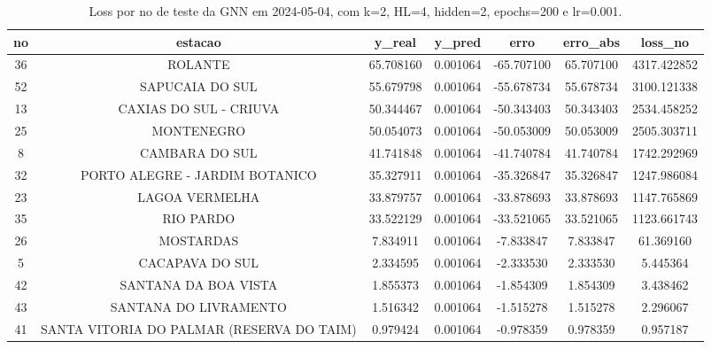 \begin{table}[h]
\centering
\caption{Loss por no de teste da GNN em 2024-05-04, com k=2, HL=4, hidden=2, epochs=200 e lr=0.001.}
\label{tab:gnn_loss_k2_hl4_h2_e200_d20240504}
\begin{tabular}{ccccccc}
\toprule
no & estacao & y\_real & y\_pred & erro & erro\_abs & loss\_no \\
\midrule
36 & ROLANTE & 65.708160 & 0.001064 & -65.707100 & 65.707100 & 4317.422852 \\
52 & SAPUCAIA DO SUL & 55.679798 & 0.001064 & -55.678734 & 55.678734 & 3100.121338 \\
13 & CAXIAS DO SUL - CRIUVA & 50.344467 & 0.001064 & -50.343403 & 50.343403 & 2534.458252 \\
25 & MONTENEGRO & 50.054073 & 0.001064 & -50.053009 & 50.053009 & 2505.303711 \\
8 & CAMBARA DO SUL & 41.741848 & 0.001064 & -41.740784 & 41.740784 & 1742.292969 \\
32 & PORTO ALEGRE - JARDIM BOTANICO & 35.327911 & 0.001064 & -35.326847 & 35.326847 & 1247.986084 \\
23 & LAGOA VERMELHA & 33.879757 & 0.001064 & -33.878693 & 33.878693 & 1147.765869 \\
35 & RIO PARDO & 33.522129 & 0.001064 & -33.521065 & 33.521065 & 1123.661743 \\
26 & MOSTARDAS & 7.834911 & 0.001064 & -7.833847 & 7.833847 & 61.369160 \\
5 & CACAPAVA DO SUL & 2.334595 & 0.001064 & -2.333530 & 2.333530 & 5.445364 \\
42 & SANTANA DA BOA VISTA & 1.855373 & 0.001064 & -1.854309 & 1.854309 & 3.438462 \\
43 & SANTANA DO LIVRAMENTO & 1.516342 & 0.001064 & -1.515278 & 1.515278 & 2.296067 \\
41 & SANTA VITORIA DO PALMAR (RESERVA DO TAIM) & 0.979424 & 0.001064 & -0.978359 & 0.978359 & 0.957187 \\
\bottomrule
\end{tabular}
\end{table}
